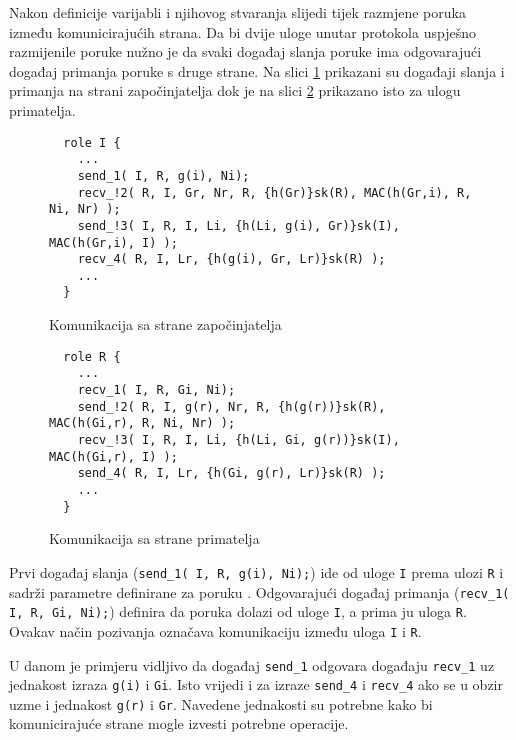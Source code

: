 Nakon definicije varijabli i njihovog stvaranja slijedi tijek razmjene poruka
između komunicirajućih strana. Da bi dvije uloge unutar protokola uspješno
razmijenile poruke nužno je da svaki događaj slanja poruke ima odgovarajući
događaj primanja poruke s druge strane. Na slici \ref{fig:i_msgs} prikazani su
događaji slanja i primanja na strani započinjatelja dok je na slici
\ref{fig:r_msgs} prikazano isto za ulogu primatelja.

\begin{figure}[htb]
\begin{small}
\begin{verbatim}
  role I {
    ...
    send_1( I, R, g(i), Ni);
    recv_!2( R, I, Gr, Nr, R, {h(Gr)}sk(R), MAC(h(Gr,i), R, Ni, Nr) );
    send_!3( I, R, I, Li, {h(Li, g(i), Gr)}sk(I), MAC(h(Gr,i), I) );
    recv_4( R, I, Lr, {h(g(i), Gr, Lr)}sk(R) );
    ...
  }
\end{verbatim}
\end{small}
\vspace{-15pt}
\caption{Komunikacija sa strane započinjatelja}
\label{fig:i_msgs}
\end{figure}

\begin{figure}[htb]
\begin{small}
\begin{verbatim}
  role R {
    ...
    recv_1( I, R, Gi, Ni);
    send_!2( R, I, g(r), Nr, R, {h(g(r))}sk(R), MAC(h(Gi,r), R, Ni, Nr) );
    recv_!3( I, R, I, Li, {h(Li, Gi, g(r))}sk(I), MAC(h(Gi,r), I) );
    send_4( R, I, Lr, {h(Gi, g(r), Lr)}sk(R) );
    ...
  }
\end{verbatim}
\end{small}
\vspace{-15pt}
\caption{Komunikacija sa strane primatelja}
\label{fig:r_msgs}
\end{figure}

Prvi događaj slanja (\texttt{send\_1( I, R, g(i), Ni);}) ide od uloge \texttt{I}
prema ulozi \texttt{R} i sadrži parametre definirane za poruku \initi{}.
Odgovarajući događaj
primanja (\texttt{recv\_1( I, R, Gi, Ni);}) definira da poruka dolazi od uloge
\texttt{I}, a prima ju uloga \texttt{R}. Ovakav način pozivanja označava
komunikaciju između uloga \texttt{I} i \texttt{R}.
    
U danom je primjeru vidljivo da događaj \texttt{send\_1} odgovara događaju
\texttt{recv\_1} uz jednakost izraza \texttt{g(i)} i \texttt{Gi}. Isto vrijedi i
za izraze \texttt{send\_4} i \texttt{recv\_4} ako se u obzir uzme i jednakost
\texttt{g(r)} i \texttt{Gr}. Navedene jednakosti su potrebne kako bi
komunicirajuće strane mogle izvesti potrebne operacije.

